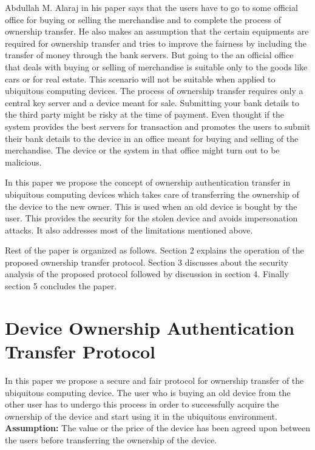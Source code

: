 \documentclass[letterpaper]{article}
\begin{document}
\par
Abdullah M. Alaraj \cite{aa} in his paper says that the users have to go to some official office for buying or selling the merchandise and to complete the process of ownership transfer. He also makes an assumption that the certain equipments are required for ownership transfer and tries to improve the fairness by including the transfer of money through the bank servers. But going to the an official office that deals with buying or selling of merchandise is suitable only to the goods like cars or for real estate. This scenario will not be suitable when applied to ubiquitous computing devices. The process of ownership transfer requires only a central key server and a device meant for sale. Submitting your bank details to the third party might be risky at the time of payment. Even thought if the system provides the best servers for transaction and promotes the users to submit their bank details to the device in an office meant for buying and selling of the merchandise. The device or the system in that office might turn out to be malicious.      

\par
In this paper we propose the concept of ownership authentication transfer in ubiquitous computing devices which takes care of transferring the ownership of the device to the new owner. This is used when an old device is bought by the user. This provides the security for the stolen device and avoids impersonation attacks. It also addresses most of the limitations mentioned above.
\par
Rest of the paper is organized as follows. Section 2 explains the operation of the proposed ownership transfer protocol. Section 3 discusses about the security analysis of the proposed protocol followed by discussion in section 4. Finally section 5 concludes the paper.



\section{Device Ownership Authentication Transfer Protocol}
In this paper we propose a secure and fair protocol for ownership transfer of the ubiquitous computing device. The user who is buying an old device from the other user has to undergo this process in order to successfully acquire the ownership of the device and start using it in the ubiquitous environment.\\

\textbf{Assumption:} The value or the price of the device has been agreed upon between the users before transferring the ownership of the device.\\
\end{document}
